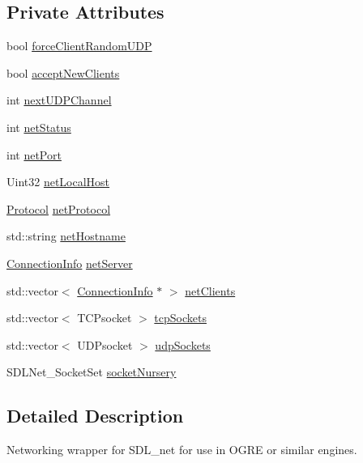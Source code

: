 \subsection*{Private Attributes}
\begin{DoxyCompactItemize}
\item 
bool \hyperlink{classNetManager_a2e5fedf3835e7c392ccb8b1a23ade8d4}{force\-Client\-Random\-U\-D\-P}
\item 
bool \hyperlink{classNetManager_a67d25cdb043a462709f1d29e071a5ce8}{accept\-New\-Clients}
\item 
int \hyperlink{classNetManager_a7505bdde90a24b85b6cb1d8d81404c5f}{next\-U\-D\-P\-Channel}
\item 
int \hyperlink{classNetManager_acd2ec7262ea71478204c9007b23d9fff}{net\-Status}
\item 
int \hyperlink{classNetManager_a2c14b6cf513287e5fb46a85ddb293201}{net\-Port}
\item 
Uint32 \hyperlink{classNetManager_a91a6c464bfed9fbd7b0815d544a62d7d}{net\-Local\-Host}
\item 
\hyperlink{NetManager_8h_a9af285d1232beed01f31aac5d3a5469f}{Protocol} \hyperlink{classNetManager_ac24652f01ef284551be311bfc408be06}{net\-Protocol}
\item 
std\-::string \hyperlink{classNetManager_ad3817c547216aaf6acddabc1d2944c01}{net\-Hostname}
\item 
\hyperlink{structConnectionInfo}{Connection\-Info} \hyperlink{classNetManager_a002692771d60d8a4332941f33096fba0}{net\-Server}
\item 
std\-::vector$<$ \hyperlink{structConnectionInfo}{Connection\-Info} $\ast$ $>$ \hyperlink{classNetManager_abe03f819c3ef02b983881db39e162003}{net\-Clients}
\item 
std\-::vector$<$ T\-C\-Psocket $>$ \hyperlink{classNetManager_a2314a1df7704bbc4c96d8d0133d78ee6}{tcp\-Sockets}
\item 
std\-::vector$<$ U\-D\-Psocket $>$ \hyperlink{classNetManager_aa99d99b6fa90707d9101c4e1a1835018}{udp\-Sockets}
\item 
S\-D\-L\-Net\-\_\-\-Socket\-Set \hyperlink{classNetManager_adc43306f83c33feb0fdd74e16c6583bb}{socket\-Nursery}
\end{DoxyCompactItemize}


\subsection{Detailed Description}
Networking wrapper for S\-D\-L\-\_\-net for use in O\-G\-R\-E or similar engines. 

